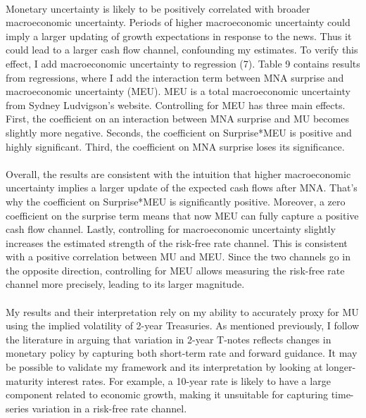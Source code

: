 \documentclass[12pt]{article}
\begin{document}
\paragraph{}
Monetary uncertainty is likely to be positively correlated with broader macroeconomic uncertainty. Periods of higher macroeconomic uncertainty could imply a larger updating of growth expectations in response to the news. Thus it could lead to a larger cash flow channel, confounding my estimates. To verify this effect, I add macroeconomic uncertainty to regression (7). Table 9 contains results from regressions, where I add the interaction term between MNA surprise and macroeconomic uncertainty (MEU). MEU is a total macroeconomic uncertainty from Sydney Ludvigson's website. Controlling for MEU has three main effects. First, the coefficient on an interaction between MNA surprise and MU becomes slightly more negative. Seconds, the coefficient on Surprise*MEU is positive and highly significant. Third, the coefficient on MNA surprise loses its significance.
\paragraph{}
Overall, the results are consistent with the intuition that higher macroeconomic uncertainty implies a larger update of the expected cash flows after MNA. That's why the coefficient on Surprise*MEU is significantly positive. Moreover, a zero coefficient on the surprise term means that now MEU can fully capture a positive cash flow channel. Lastly, controlling for macroeconomic uncertainty slightly increases the estimated strength of the risk-free rate channel. This is consistent with a positive correlation between MU and MEU. Since the two channels go in the opposite direction, controlling for MEU allows measuring the risk-free rate channel more precisely, leading to its larger magnitude. 
\paragraph{}
My results and their interpretation rely on my ability to accurately proxy for MU using the implied volatility of 2-year Treasuries. As mentioned previously, I follow the literature in arguing that variation in 2-year T-notes reflects changes in monetary policy by capturing both short-term rate and forward guidance. It may be possible to validate my framework and its interpretation by looking at longer-maturity interest rates. For example, a 10-year rate is likely to have a large component related to economic growth, making it unsuitable for capturing time-series variation in a risk-free rate channel.
\end{document}
